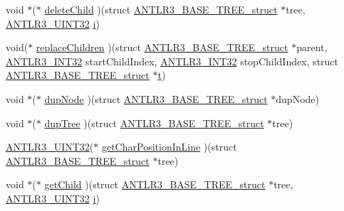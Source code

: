\begin{DoxyCompactItemize}
\item 
void $\ast$($\ast$ \hyperlink{struct_a_n_t_l_r3___b_a_s_e___t_r_e_e__struct_ab532435f4f9011eba57978598ce41f26}{delete\-Child} )(struct \hyperlink{struct_a_n_t_l_r3___b_a_s_e___t_r_e_e__struct}{A\-N\-T\-L\-R3\-\_\-\-B\-A\-S\-E\-\_\-\-T\-R\-E\-E\-\_\-struct} $\ast$tree, \hyperlink{antlr3defs_8h_ac41f744abd0fd25144b9eb9d11b1dfd1}{A\-N\-T\-L\-R3\-\_\-\-U\-I\-N\-T32} \hyperlink{_read_d_m3___matlab_8m_a6f6ccfcf58b31cb6412107d9d5281426}{i})
\item 
void($\ast$ \hyperlink{struct_a_n_t_l_r3___b_a_s_e___t_r_e_e__struct_a48bb3beff9c05579de1959f276a8c2c1}{replace\-Children} )(struct \hyperlink{struct_a_n_t_l_r3___b_a_s_e___t_r_e_e__struct}{A\-N\-T\-L\-R3\-\_\-\-B\-A\-S\-E\-\_\-\-T\-R\-E\-E\-\_\-struct} $\ast$parent, \hyperlink{antlr3defs_8h_a6faef5c4687f8eb633d2aefea93973ca}{A\-N\-T\-L\-R3\-\_\-\-I\-N\-T32} start\-Child\-Index, \hyperlink{antlr3defs_8h_a6faef5c4687f8eb633d2aefea93973ca}{A\-N\-T\-L\-R3\-\_\-\-I\-N\-T32} stop\-Child\-Index, struct \hyperlink{struct_a_n_t_l_r3___b_a_s_e___t_r_e_e__struct}{A\-N\-T\-L\-R3\-\_\-\-B\-A\-S\-E\-\_\-\-T\-R\-E\-E\-\_\-struct} $\ast$\hyperlink{showimage_8m_ad941f6ef920fbfb3d75b60ddbedbdd39}{t})
\item 
void $\ast$($\ast$ \hyperlink{struct_a_n_t_l_r3___b_a_s_e___t_r_e_e__struct_adfea4c4a926504619d1d6fed82aedff4}{dup\-Node} )(struct \hyperlink{struct_a_n_t_l_r3___b_a_s_e___t_r_e_e__struct}{A\-N\-T\-L\-R3\-\_\-\-B\-A\-S\-E\-\_\-\-T\-R\-E\-E\-\_\-struct} $\ast$dup\-Node)
\item 
void $\ast$($\ast$ \hyperlink{struct_a_n_t_l_r3___b_a_s_e___t_r_e_e__struct_a471c30eaee3791629a442719c5f59bba}{dup\-Tree} )(struct \hyperlink{struct_a_n_t_l_r3___b_a_s_e___t_r_e_e__struct}{A\-N\-T\-L\-R3\-\_\-\-B\-A\-S\-E\-\_\-\-T\-R\-E\-E\-\_\-struct} $\ast$tree)
\item 
\hyperlink{antlr3defs_8h_ac41f744abd0fd25144b9eb9d11b1dfd1}{A\-N\-T\-L\-R3\-\_\-\-U\-I\-N\-T32}($\ast$ \hyperlink{struct_a_n_t_l_r3___b_a_s_e___t_r_e_e__struct_aa77dee62cb6ca894fa7bd0c091f46258}{get\-Char\-Position\-In\-Line} )(struct \hyperlink{struct_a_n_t_l_r3___b_a_s_e___t_r_e_e__struct}{A\-N\-T\-L\-R3\-\_\-\-B\-A\-S\-E\-\_\-\-T\-R\-E\-E\-\_\-struct} $\ast$tree)
\item 
void $\ast$($\ast$ \hyperlink{struct_a_n_t_l_r3___b_a_s_e___t_r_e_e__struct_a29e552d31a26a01f25974fcf3bd8731e}{get\-Child} )(struct \hyperlink{struct_a_n_t_l_r3___b_a_s_e___t_r_e_e__struct}{A\-N\-T\-L\-R3\-\_\-\-B\-A\-S\-E\-\_\-\-T\-R\-E\-E\-\_\-struct} $\ast$tree, \hyperlink{antlr3defs_8h_ac41f744abd0fd25144b9eb9d11b1dfd1}{A\-N\-T\-L\-R3\-\_\-\-U\-I\-N\-T32} \hyperlink{_read_d_m3___matlab_8m_a6f6ccfcf58b31cb6412107d9d5281426}{i})

\end{DoxyCompactItemize}
